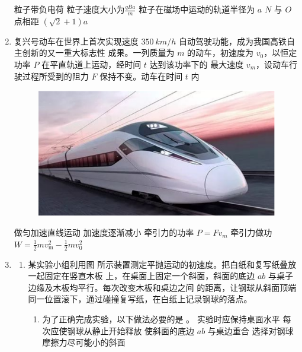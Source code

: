\begin{enumerate}
\fourchoices
{粒子带负电荷}
{粒子速度大小为$\frac{q B a}{m}$}
{粒子在磁场中运动的轨道半径为 $ a $}
{$ N $ 与 $ O $ 点相距 $ (\sqrt{2}+1)a $}





\item
复兴号动车在世界上首次实现速度 $ 350 \ km/h $ 自动驾驶功能，成为我国高铁自主创新的又一重大标志性
成果。一列质量为 $ m $ 的动车，初速度为 $ v_{0} $，以恒定功率 $ P $ 在平直轨道上运动，经时间 $ t $ 达到该功率下的
最大速度 $ v_{m} $，设动车行驶过程所受到的阻力 $ F $ 保持不变。动车在时间 $ t $ 内  
\begin{figure}[h!]
\centering
\includegraphics[width=0.3\linewidth]{picture/screenshot055}
\end{figure}


\fourchoices
{做匀加速直线运动}
{加速度逐渐减小}
{牵引力的功率 $ P=Fv_{m} $}
{牵引力做功 $W=\frac{1}{2} m v_{\mathrm{m}}^{2}-\frac{1}{2} m v_{0}^{2}$}






\gaokaosy

\item
\begin{enumerate}
\item
某实验小组利用图  所示装置测定平抛运动的初速度。把白纸和复写纸叠放一起固定在竖直木板
上，在桌面上固定一个斜面，斜面的底边 $ ab $ 与桌子边缘及木板均平行。每次改变木板和桌边之间
的距离，让钢球从斜面顶端同一位置滚下，通过碰撞复写纸，在白纸上记录钢球的落点。
\begin{figure}[h!]
\centering
\begin{subfigure}{0.4\linewidth}
\centering
 
\caption{}\label{2020天津09a}
\end{subfigure}
\begin{subfigure}{0.4\linewidth}
\centering
 
\caption{}\label{2020天津09b}
\end{subfigure}
\end{figure}

\begin{enumerate}
\item
为了正确完成实验，以下做法必要的是 \underlinegap 。
\fourchoices
{实验时应保持桌面水平}
{每次应使钢球从静止开始释放}
{使斜面的底边 $ ab $ 与桌边重合}
{选择对钢球摩擦力尽可能小的斜面}


\end{enumerate}
\end{enumerate}
\end{enumerate}
